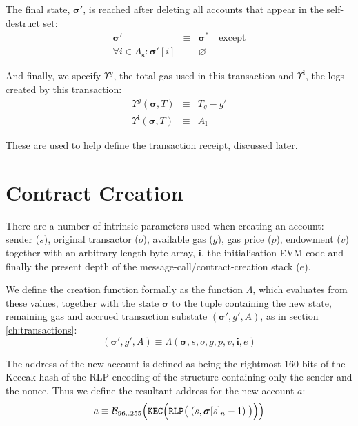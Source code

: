 \documentclass[9pt,oneside]{amsart}
\begin{document}
\begin{multicols}{2}
The final state, $\boldsymbol{\sigma}'$, is reached after deleting all accounts that appear in the self-destruct set:
\begin{eqnarray}
\boldsymbol{\sigma}' & \equiv & \boldsymbol{\sigma}^* \quad \text{except} \\
\forall i \in A_\mathbf{s}: \boldsymbol{\sigma}'[i] & \equiv & \varnothing
\end{eqnarray}

And finally, we specify $\Upsilon^g$, the total gas used in this transaction and $\Upsilon^\mathbf{l}$, the logs created by this transaction:
\begin{eqnarray}
\Upsilon^g(\boldsymbol{\sigma}, T) & \equiv & T_g - g' \\
\Upsilon^\mathbf{l}(\boldsymbol{\sigma}, T) & \equiv & A_\mathbf{l}
\end{eqnarray}

These are used to help define the transaction receipt, discussed later.

\section{Contract Creation} \label{ch:create}

There are a number of intrinsic parameters used when creating an account: sender ($s$), original transactor ($o$), available gas ($g$), gas price ($p$), endowment ($v$) together with an arbitrary length byte array, $\mathbf{i}$, the initialisation EVM code and finally the present depth of the message-call/contract-creation stack ($e$).

We define the creation function formally as the function $\Lambda$, which evaluates from these values, together with the state $\boldsymbol{\sigma}$ to the tuple containing the new state, remaining gas and accrued transaction substate $(\boldsymbol{\sigma}', g', A)$, as in section \ref{ch:transactions}:
\begin{equation}
(\boldsymbol{\sigma}', g', A) \equiv \Lambda(\boldsymbol{\sigma}, s, o, g, p, v, \mathbf{i}, e)
\end{equation}

The address of the new account is defined as being the rightmost 160 bits of the Keccak hash of the RLP encoding of the structure containing only the sender and the nonce. Thus we define the resultant address for the new account $a$:
\begin{equation}
a \equiv \mathcal{B}_{96..255}\Big(\mathtt{\tiny KEC}\Big(\mathtt{\tiny RLP}\big(\;(s, \boldsymbol{\sigma}[s]_n - 1)\;\big)\Big)\Big)
\end{equation}


\end{multicols}
\end{document}
